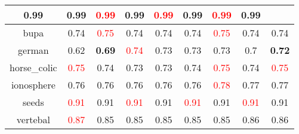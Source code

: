 \documentclass{article}%
\begin{document}
\begin{tabular}{c|cccccccc}
{0.99
}&0.99&\textcolor{red}{ 
0.99
}&0.99&\textcolor{red}{ 
0.99
}&0.99&\textcolor{red}{ 
0.99
}&0.99\\%
\hline%
bupa&0.74&\textcolor{red}{ 
0.75
}&0.74&0.74&0.74&\textcolor{red}{ 
0.75
}&0.74&0.74\\%
\hline%
german&0.62&\textbf{0.69}&\textcolor{red}{ 
0.74
}&0.73&0.73&0.73&0.7&\textbf{0.72}\\%
\hline%
horse\_colic&\textcolor{red}{ 
0.75
}&0.74&0.73&0.73&0.74&\textcolor{red}{ 
0.75
}&0.74&\textcolor{red}{ 
0.75
}\\%
\hline%
ionosphere&0.76&0.76&0.76&0.76&0.76&\textcolor{red}{ 
0.78
}&0.77&0.77\\%
\hline%
seeds&\textcolor{red}{ 
0.91
}&0.91&\textcolor{red}{ 
0.91
}&0.91&\textcolor{red}{ 
0.91
}&0.91&\textcolor{red}{ 
0.91
}&0.91\\%
\hline%
vertebal&\textcolor{red}{ 
0.87
}&0.85&0.85&0.85&0.85&0.85&0.86&0.86\\%
\hline%
\end{tabular}

%
\end{document}
